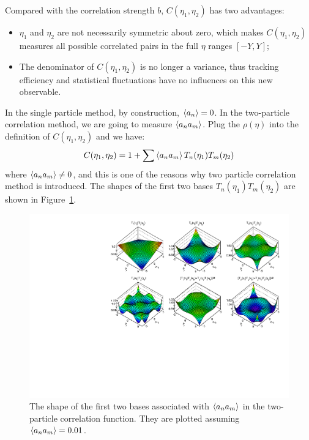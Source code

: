 Compared with the correlation strength $b$, $C(\eta_1, \eta_2)$ has two advantages:
\begin{itemize}
\item $\eta_1$ and $\eta_2$ are not necessarily symmetric about zero, which makes $C(\eta_1, \eta_2)$ measures all possible correlated pairs in the full $\eta$ ranges $[-Y, Y]$;
\item The denominator of $C(\eta_1, \eta_2)$ is no longer a variance, thus tracking efficiency and statistical fluctuations have no influences on this new observable. 
\end{itemize}

In the single particle method, by construction, $\left\langle a_n\right\rangle = 0$. In the two-particle correlation method, we are going to measure $\left\langle a_n a_m\right\rangle$. Plug the $\rho(\eta)$ into the definition of $C(\eta_1, \eta_2)$ and we have:
\begin{equation}
C(\eta_1, \eta_2) = 1 + \sum \left\langle a_n a_m\right\rangle T_n(\eta_1) T_m(\eta_2)
\end{equation}
where $\left\langle a_n a_m\right\rangle \neq 0$, and this is one of the reasons why two particle correlation method is introduced. The shapes of the first two bases $T_n(\eta_1)T_m(\eta_2)$ are shown in Figure~\ref{fig:fbcorr_Legendre_base_2D}.

\begin{figure}[H]
\centering
\includegraphics[width=.95\linewidth]{figs/chapter_fbcorr/Legendre_base_2D.pdf}
\caption{The shape of the first two bases associated with $\left\langle a_n a_m\right\rangle$ in the two-particle correlation function. They are plotted assuming $\left\langle a_n a_m\right\rangle=0.01$.}
\label{fig:fbcorr_Legendre_base_2D}
\end{figure}

